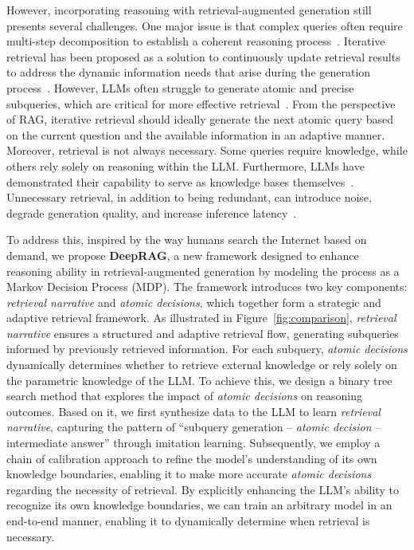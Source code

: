 However, incorporating reasoning with retrieval-augmented generation still presents several challenges.
% 
One major issue is that complex queries often require multi-step decomposition to establish a coherent reasoning process~\cite{radhakrishnan2023question}. Iterative retrieval has been proposed as a solution to continuously update retrieval results to address the dynamic information needs that arise during the generation process~\cite{yue2024inference}. 
However, LLMs often struggle to generate atomic and precise subqueries, which are critical for more effective retrieval~\cite{wu2024divide}.
From the perspective of RAG, iterative retrieval should ideally generate the next atomic query based on the current question and the available information in an adaptive manner. 
% 
Moreover, retrieval is not always necessary. 
Some queries require knowledge, while others rely solely on reasoning within the LLM. 
Furthermore, LLMs have demonstrated their capability to serve as knowledge bases themselves~\cite{petroni-etal-2019-language}.
% 
Unnecessary retrieval, in addition to being redundant, can introduce noise, degrade generation quality, and increase inference latency~\cite{chen2023understanding,tan2024blinded,bian2024influence}.


To address this, 
inspired by the way humans search the Internet based on demand, we propose \textbf{DeepRAG}, a new framework designed to enhance reasoning ability in retrieval-augmented generation by modeling the process as a Markov Decision Process (MDP).
% 
The framework introduces two key components: \textit{retrieval narrative} and \textit{atomic decisions}, which together form a strategic and adaptive retrieval framework.
% 
As illustrated in Figure~\ref{fig:comparison}, \textit{retrieval narrative} ensures a structured and adaptive retrieval flow, generating subqueries informed by previously retrieved information. 
For each subquery, \textit{atomic decisions} dynamically determines whether to retrieve external knowledge or rely solely on the parametric knowledge of the LLM.
% 
To achieve this, we design a binary tree search method that explores the impact of \textit{atomic decisions} on reasoning outcomes.
% 
Based on it, we first synthesize data to the LLM to learn \textit{retrieval narrative}, capturing the pattern of ``subquery generation – \textit{atomic decision} – intermediate answer''  through imitation learning. 
% 
Subsequently, we employ a chain of calibration approach to refine the model's understanding of its own knowledge boundaries, enabling it to make more accurate \textit{atomic decisions} regarding the necessity of retrieval.
% 
By explicitly enhancing the LLM's ability to recognize its own knowledge boundaries, we can train an arbitrary model in an end-to-end manner, enabling it to dynamically determine when retrieval is necessary.

